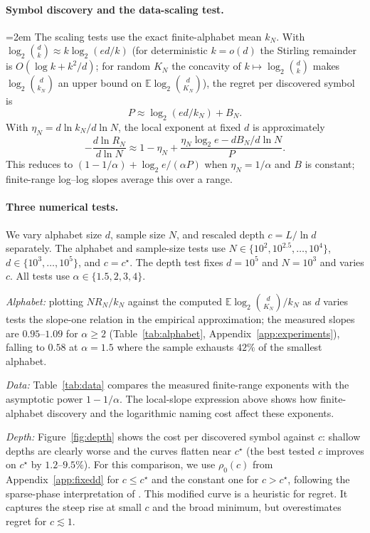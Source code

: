 \documentclass[anon]{alt2027}
\newcommand{\E}{\mathbb{E}}
\newcommand{\cstar}{c^{\star}}
\begin{document}
\paragraph{Symbol discovery and the data-scaling test.}
{\emergencystretch=2em
The scaling tests use the exact finite-alphabet mean $k_N$. With $\log_2\binom dk\approx k\log_2(ed/k)$ (for deterministic $k=o(d)$ the Stirling remainder is $O(\log k+k^2/d)$; for random $K_N$ the concavity of $k\mapsto\log_2\binom dk$ makes $\log_2\binom d{k_N}$ an upper bound on $\E\log_2\binom d{K_N}$), the regret per discovered symbol is \[ P\approx\log_2(ed/k_N)+B_N. \] With $\eta_N=d\ln k_N/d\ln N$, the local exponent at fixed $d$ is approximately \[ -\frac{d\ln R_N}{d\ln N}\approx1-\eta_N+\frac{\eta_N\log_2e-dB_N/d\ln N}{P}. \] This reduces to $(1-1/\alpha)+\log_2e/(\alpha P)$ when $\eta_N=1/\alpha$ and $B$ is constant; finite-range log--log slopes average this over a range. \par}


\paragraph{Three numerical tests.}
We vary alphabet size $d$, sample size $N$, and rescaled depth $c=L/\ln d$ separately. The alphabet and sample-size tests use $N\in\{10^2,10^{2.5},\dots,10^4\}$, $d\in\{10^3,\dots,10^5\}$, and $c=\cstar$. The depth test fixes $d=10^5$ and $N=10^3$ and varies $c$. All tests use $\alpha\in\{1.5,2,3,4\}$.

\emph{Alphabet:} plotting $NR_N/k_N$ against the computed $\E\log_2\binom{d}{K_N}/k_N$ as $d$ varies tests the slope-one relation in the empirical approximation; the measured slopes are $0.95$--$1.09$ for $\alpha\ge2$ (Table~\ref{tab:alphabet}, Appendix~\ref{app:experiments}), falling to $0.58$ at $\alpha=1.5$ where the sample exhausts $42\%$ of the smallest alphabet. 

\emph{Data:} Table~\ref{tab:data} compares the measured finite-range exponents with the asymptotic power $1-1/\alpha$. The local-slope expression above shows how finite-alphabet discovery and the logarithmic naming cost affect these exponents.

\emph{Depth:} Figure~\ref{fig:depth} shows the cost per discovered symbol against $c$: shallow depths are clearly worse and the curves flatten near $\cstar$ (the best tested $c$ improves on $\cstar$ by $1.2$--$9.5\%$). For this comparison, we use $\rho_0(c)$ from Appendix~\ref{app:fixedd} for $c\le\cstar$ and the constant one for $c>\cstar$, following the sparse-phase interpretation of \citet{jeong2026phase}. This modified curve is a heuristic for regret. It captures the steep rise at small $c$ and the broad minimum, but overestimates regret for $c\lesssim1$.
\end{document}
